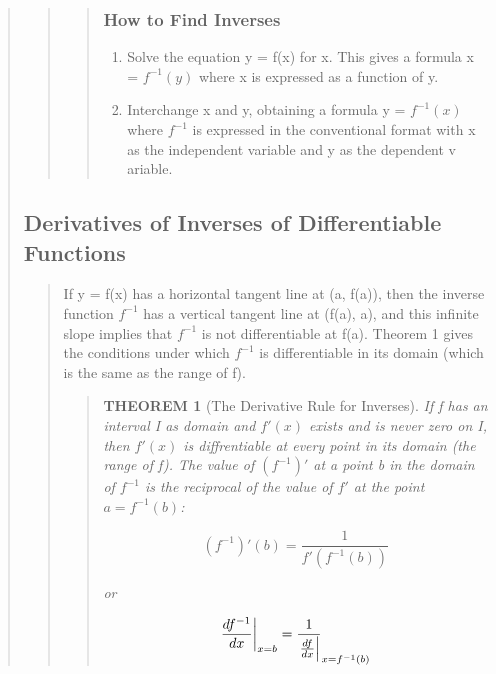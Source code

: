 \documentclass{report}
\newtheorem{theorem}{THEOREM}
\begin{document}
\begin{quote}
\begin{quote}
\begin{quote}
			\subsubsection{How to Find Inverses}
			\begin{enumerate}
				\item Solve the equation y = ƒ(x) for x. This gives a formula x = $f^{-1}(y)$ where x is expressed as a function of y.
				\item Interchange x and y, obtaining a formula y = $f^{-1}(x)$ where $f^{-1}$ is expressed in the conventional format with x as the independent variable and y as the dependent v ariable.
			\end{enumerate}
			
		\end{quote}
	\end{quote}
	
	
	\subsection{Derivatives of Inverses of Differentiable Functions}
	\begin{quote}
		
		If y = ƒ(x) has a horizontal tangent line at (a, ƒ(a)), then the inverse function $f^{-1}$ has a vertical tangent line at (ƒ(a), a), and this infinite slope implies that $f^{-1}$ is not differentiable at ƒ(a). Theorem 1 gives the conditions under which $f^{-1}$ is differentiable in its domain (which is the same as the range of ƒ).
		
		\begin{quote}
			\begin{theorem}[The Derivative Rule for Inverses]
				\mbox{}\par %

				If ƒ has an interval I as domain and $f'(x)$ exists and is never zero on I, then $f'(x)$ is diffrentiable at every point in its domain (the range of f). The value of $(f^{-1})'$ at a point b in the domain of $f^{-1}$ is the reciprocal of the value of $f'$ at the point $a = f^{-1}(b)$:

				$$(f^{-1})'(b)=\frac{1}{f'(f^{-1}(b))}$$

				or

				$$\eval{\frac{df^{-1}}{dx}}_{x=b} = \frac{1}{\eval{\frac{df}{dx}}}_{x = f^{-1}(b)}$$

			\end{theorem}
		\end{quote}

	\end{quote}
	
\end{quote}
\end{document}
